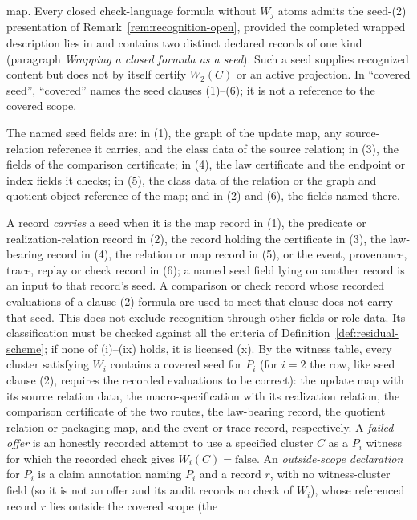 \begin{definition}
map. Every closed check-language formula without \(W_j\) atoms admits the
seed-(2) presentation of Remark~\ref{rem:recognition-open}, provided the completed wrapped description lies in \FATCD{} and contains two distinct
declared records of one kind (paragraph \emph{Wrapping a closed formula as a \Ptwo{} seed}). Such a seed
supplies recognized \Ptwo{} content but does not by itself certify \(W_2(C)\) or
an active \Ptwo{} projection. In ``covered seed'', ``covered''
names the seed clauses (1)--(6); it is not a reference to the covered scope.
\par The named seed fields are: in (1), the graph of the update map, any
source-relation reference it carries, and the class data of the source
relation; in (3), the
fields of the comparison certificate; in (4), the law certificate and the
endpoint or index fields it checks; in (5), the class data of the relation or
the graph and quotient-object reference of the map; and in (2) and (6), the
fields named there.
\par A record \emph{carries} a seed when it is the map record in
(1), the predicate or realization-relation record in (2), the record holding
the certificate in (3), the law-bearing record in (4), the relation or map
record in (5), or the event, provenance, trace, replay or check record in (6);
a named seed field lying on another record is an input to that record's
seed. A comparison or check record whose recorded evaluations of a clause-(2) formula are used to meet that clause does not carry that seed. This does not exclude recognition through other fields or role data. Its classification must be checked against all the criteria of Definition~\ref{def:residual-scheme}; if none of (i)--(ix) holds, it is licensed (x). By the witness table, every cluster satisfying \(W_i\) contains a
covered seed for \(P_i\) (for \(i=2\) the row, like seed clause (2), requires the recorded evaluations
to be correct): the update map with its source relation data, the
macro-specification with its realization relation, the comparison certificate
of the two routes, the law-bearing record, the quotient relation or packaging
map, and the event or trace record, respectively. A \emph{failed offer} is an
honestly recorded attempt to use a specified cluster \(C\) as a \(P_i\)
witness for which the recorded check gives \(W_i(C)=\mathrm{false}\). An \emph{outside-scope declaration} for \(P_i\) is a claim annotation naming
\(P_i\) and a record \(r\), with no witness-cluster field (so it is not an offer
and its audit records no check of \(W_i\)), whose referenced record \(r\) lies outside the covered scope (the

\end{definition}
